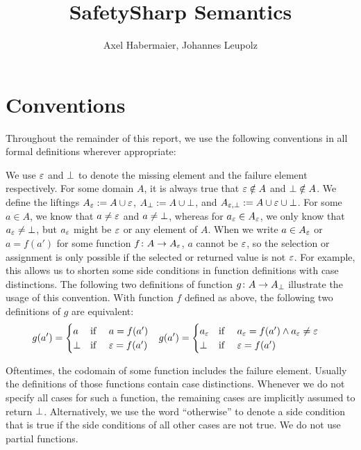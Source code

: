 \documentclass[a4paper,10pt,english]{article}
\title{SafetySharp Semantics}
\author{Axel Habermaier, Johannes Leupolz}
\begin{document}
 
\maketitle

\section{Conventions}
Throughout the remainder of this report, we use the following conventions in all formal definitions wherever appropriate:

	We use $\varepsilon$ and $\bot$ to denote the missing element and the failure element respectively. For some domain $A$, it is
	always true that $\varepsilon \notin A$ and $\bot \notin A$. We define the liftings $A_\varepsilon := A \cup
	\varepsilon$, $A_\bot := A \cup \bot$, and $A_{\varepsilon, \bot} := A \cup \varepsilon \cup	\bot$.
	For some $a \in A$, we know that $a \neq \varepsilon$ and $a \neq \bot$, whereas for $a_\varepsilon \in
	A_\varepsilon$, we only know that $a_\varepsilon \neq \bot$, but $a_\varepsilon$ might be $\varepsilon$ or
	any element of $A$. When we write $a \in A_\varepsilon$ or $a = f(a')$ for some function $f \colon A \rightarrow
	A_\varepsilon$, $a$ cannot be $\varepsilon$, so the selection or assignment is only possible if the selected or
	returned value is not $\varepsilon$. For example, this allows us to shorten some side conditions in function definitions with case
	distinctions. The following two definitions of function $g \colon A \rightarrow A_\bot$ illustrate the usage of this
	convention.
	With function $f$ defined as above, the following two definitions of $g$ are equivalent:
	\begin{align*}
		g(a') = \begin{cases}
			a & \text{if } \quad a = f(a') \\
			\bot & \text{if } \quad \varepsilon = f(a')
		\end{cases} 
		&&&
		g(a') = \begin{cases}
			a_\varepsilon & \text{if } \quad a_\varepsilon = f(a') \wedge a_\varepsilon \neq \varepsilon	\\
			\bot & \text{if } \quad \varepsilon = f(a')
		\end{cases}
	\end{align*}

	Oftentimes, the codomain of some function includes the failure element. Usually the definitions of those functions contain case distinctions.
	Whenever we do not specify all cases for such a function, the remaining cases are implicitly assumed to return $\bot$.
	Alternatively, we use the word ``otherwise'' to denote a side condition that is true if the side conditions of all other cases are not true. We do not use partial functions.
\end{document}
